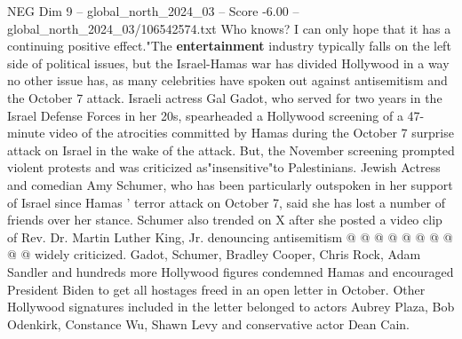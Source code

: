 \begin{textsample}{NEG Dim 9 – global\_north\_2024\_03 – Score -6.00 – global\_north\_2024\_03/106542574.txt}
Who knows?
I can only hope that it has a continuing positive effect."The \textbf{entertainment} industry typically falls on the left side of political issues, but the Israel-Hamas war has divided Hollywood in a way no other issue has, as many celebrities have spoken out against antisemitism and the October 7 attack.
Israeli actress Gal Gadot, who served for two years in the Israel Defense Forces in her 20s, spearheaded a Hollywood screening of a 47-minute video of the atrocities committed by Hamas during the October 7 surprise attack on Israel in the wake of the attack.
But, the November screening prompted violent protests and was criticized as"insensitive"to Palestinians.
Jewish Actress and comedian Amy Schumer, who has been particularly outspoken in her support of Israel since Hamas ' terror attack on October 7, said she has lost a number of friends over her stance.
Schumer also trended on X after she posted a video clip of Rev.
Dr.
Martin Luther King, Jr. denouncing antisemitism @ @ @ @ @ @ @ @ @ @ widely criticized.
Gadot, Schumer, Bradley Cooper, Chris Rock, Adam Sandler and hundreds more Hollywood figures condemned Hamas and encouraged President Biden to get all hostages freed in an open letter in October.
Other Hollywood signatures included in the letter belonged to actors Aubrey Plaza, Bob Odenkirk, Constance Wu, Shawn Levy and conservative actor Dean Cain.

\end{textsample}
